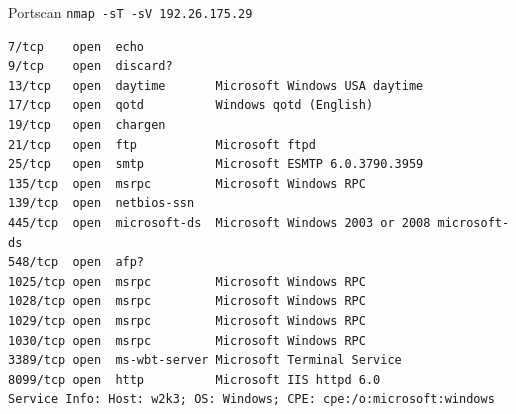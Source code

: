 \documentclass{beamer}
\begin{document}
\begin{frame}[fragile]
Portscan \texttt{nmap -sT -sV 192.26.175.29}
\begin{footnotesize}
\begin{verbatim}
7/tcp    open  echo
9/tcp    open  discard?
13/tcp   open  daytime       Microsoft Windows USA daytime
17/tcp   open  qotd          Windows qotd (English)
19/tcp   open  chargen
21/tcp   open  ftp           Microsoft ftpd
25/tcp   open  smtp          Microsoft ESMTP 6.0.3790.3959
135/tcp  open  msrpc         Microsoft Windows RPC
139/tcp  open  netbios-ssn
445/tcp  open  microsoft-ds  Microsoft Windows 2003 or 2008 microsoft-ds
548/tcp  open  afp?
1025/tcp open  msrpc         Microsoft Windows RPC
1028/tcp open  msrpc         Microsoft Windows RPC
1029/tcp open  msrpc         Microsoft Windows RPC
1030/tcp open  msrpc         Microsoft Windows RPC
3389/tcp open  ms-wbt-server Microsoft Terminal Service
8099/tcp open  http          Microsoft IIS httpd 6.0
Service Info: Host: w2k3; OS: Windows; CPE: cpe:/o:microsoft:windows
\end{verbatim}
\end{footnotesize}

\end{frame}
\end{document}
